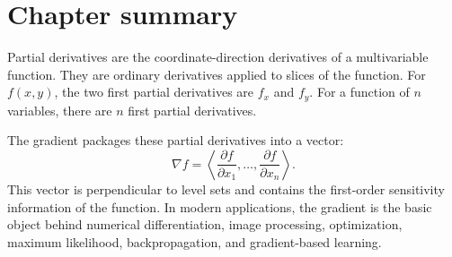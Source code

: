 \documentclass[11pt]{article}
\newcommand{\grad}{\nabla}
\begin{document}
\section{Chapter summary}

Partial derivatives are the coordinate-direction derivatives of a multivariable function. They are ordinary derivatives applied to slices of the function. For $f(x,y)$, the two first partial derivatives are $f_x$ and $f_y$. For a function of $n$ variables, there are $n$ first partial derivatives.

The gradient packages these partial derivatives into a vector:
\[
\grad f=\left\langle
\frac{\partial f}{\partial x_1},
\ldots,
\frac{\partial f}{\partial x_n}
\right\rangle.
\]
This vector is perpendicular to level sets and contains the first-order sensitivity information of the function. In modern applications, the gradient is the basic object behind numerical differentiation, image processing, optimization, maximum likelihood, backpropagation, and gradient-based learning.
\end{document}

